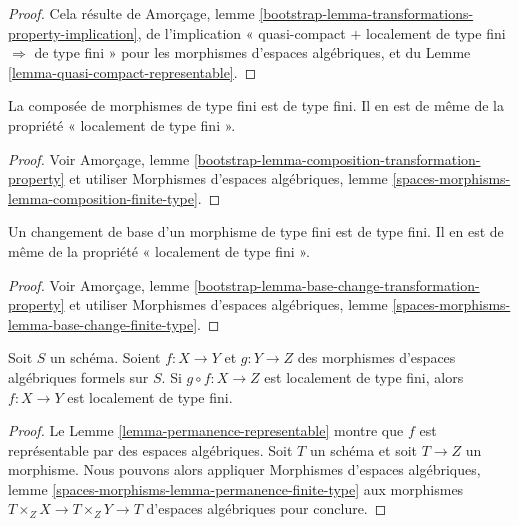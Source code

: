 \begin{proof}
Cela résulte de Amorçage, lemme
\ref{bootstrap-lemma-transformations-property-implication},
de l'implication « quasi-compact $+$ localement de type fini
$\Rightarrow$ de type fini » pour les morphismes d'espaces algébriques, et du
Lemme \ref{lemma-quasi-compact-representable}.
\end{proof}

\begin{lemma}
\label{lemma-composition-finite-type}
La composée de morphismes de type fini est de type fini.
Il en est de même de la propriété « localement de type fini ».
\end{lemma}

\begin{proof}
Voir Amorçage, lemme \ref{bootstrap-lemma-composition-transformation-property}
et utiliser Morphismes d'espaces algébriques, lemme
\ref{spaces-morphisms-lemma-composition-finite-type}.
\end{proof}

\begin{lemma}
\label{lemma-base-change-finite-type}
Un changement de base d'un morphisme de type fini est de type fini.
Il en est de même de la propriété « localement de type fini ».
\end{lemma}

\begin{proof}
Voir Amorçage, lemme \ref{bootstrap-lemma-base-change-transformation-property}
et utiliser Morphismes d'espaces algébriques, lemme
\ref{spaces-morphisms-lemma-base-change-finite-type}.
\end{proof}

\begin{lemma}
\label{lemma-permanence-finite-type}
Soit $S$ un schéma. Soient $f : X \to Y$ et $g : Y \to Z$ des morphismes
d'espaces algébriques formels sur $S$. Si $g \circ f : X \to Z$ est localement de
type fini, alors $f : X \to Y$ est localement de type fini.
\end{lemma}

\begin{proof}
Le Lemme \ref{lemma-permanence-representable} montre que $f$ est
représentable par des espaces algébriques. Soit $T$ un schéma et soit
$T \to Z$ un morphisme. Nous pouvons alors appliquer
Morphismes d'espaces algébriques, lemme \ref{spaces-morphisms-lemma-permanence-finite-type}
aux morphismes
$T \times_Z X \to T \times_Z Y \to T$ d'espaces algébriques pour conclure.
\end{proof}

